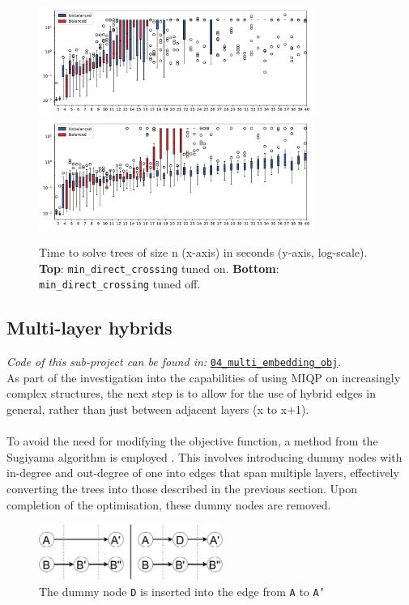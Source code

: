 \documentclass{article}
\begin{document}
\begin{figure}[H]
    \centering
    \includegraphics[width=0.8\textwidth]{figures/03_perf_min_crossing.pdf}\\
    \includegraphics[width=0.8\textwidth]{figures/03_perf_without.pdf}\\
    \caption{Time to solve trees of size n (x-axis) in seconds (y-axis, log-scale). \textbf{Top}: \texttt{min\_direct\_crossing} tuned on. \textbf{Bottom}: \texttt{min\_direct\_crossing} tuned off.}
    \label{fig:runtime-tree}
\end{figure}
\newpage
\subsection*{Multi-layer hybrids}
\textit{Code of this sub-project can be found in: }\href{https://github.com/not-a-feature/Layouting-Phylogenetic-Networks-using-MIQP/tree/main/04_multi_embedding_obj}{\texttt{04\_multi\_embedding\_obj}}.\\
As part of the investigation into the capabilities of using \ac{MIQP} on increasingly complex structures, the next step is to allow for the use of hybrid edges in general, rather than just between adjacent layers (x to x+1).\\\\

To avoid the need for modifying the objective function, a method from the Sugiyama algorithm is employed \cite{sugiyama}. This involves introducing dummy nodes with in-degree and out-degree of one into edges that span multiple layers, effectively converting the trees into those described in the previous section. Upon completion of the optimisation, these dummy nodes are removed.
\begin{figure}[H]
    \centering
    \includegraphics[width=6cm]{figures/dummy_nodes.pdf}
    \caption{The dummy node \texttt{D} is inserted into the edge from \texttt{A} to \texttt{A'}}
    \label{fig:dummy}
\end{figure}
\end{document}
